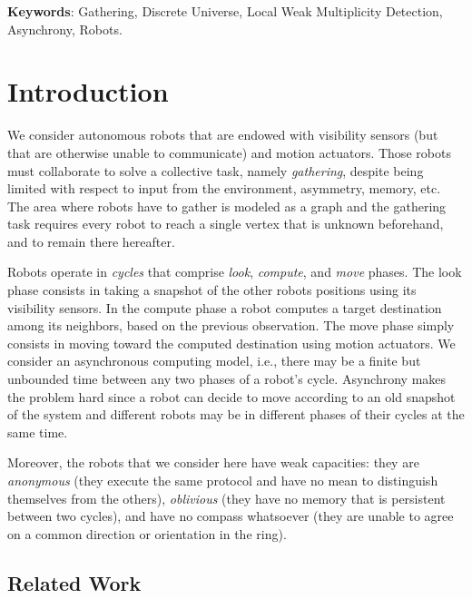 \documentclass[11pt]{article}
\begin{document}
\centerline{{\bf Keywords}: Gathering, Discrete Universe, Local Weak Multiplicity Detection, Asynchrony, Robots. }

\section{Introduction}

We consider autonomous robots that are endowed with visibility sensors (but that are otherwise unable to communicate) and motion actuators. Those robots must collaborate to solve a collective task, namely \emph{gathering}, despite being limited with respect to input from the environment, asymmetry, memory, etc. The area where robots have to gather is modeled as a graph and the gathering task requires every robot to reach a single vertex that is unknown beforehand, and to remain there hereafter.

Robots operate in \emph{cycles} that comprise \emph{look}, \emph{compute}, and \emph{move} phases. The look phase consists in taking a snapshot of the other robots positions using its visibility sensors. In the compute phase a robot computes a target destination among its neighbors, based on the previous observation. The move phase simply consists in moving toward the computed destination using motion actuators. We consider an asynchronous computing model, i.e., there may be a finite but unbounded time between any two phases of a robot's cycle. Asynchrony makes the problem hard since a robot can decide to move according to an old snapshot of the system and different robots may be in different phases of their cycles at the same time.

Moreover, the robots that we consider here have weak capacities: they are \emph{anonymous} (they execute the same protocol and have no mean to distinguish themselves from the others), \emph{oblivious} (they have no memory that is persistent between two cycles), and have no compass whatsoever (they are unable to agree on a common direction or orientation in the ring). 

\subsection{Related Work}\label{sec:RW}
\end{document}
